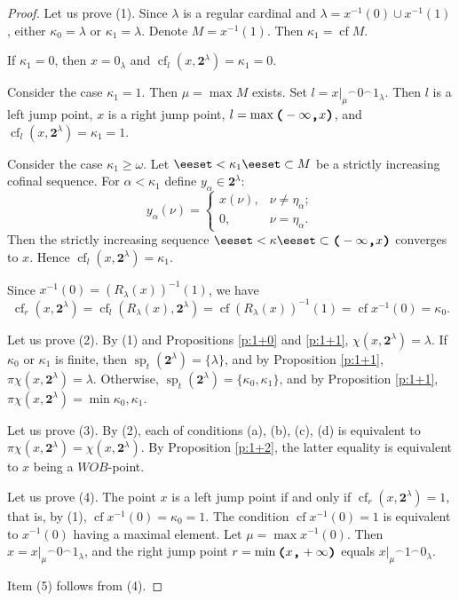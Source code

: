 \documentclass[preprint]{elsarticle}
\def\om{\omega}
\def\al{\alpha}
\def\la{\lambda}
\def\ka{\kappa}
\def\sp{\operatorname{sp}}
\def\sset#1{\{#1\}}
\def\set#1{\bbset#1\eeset}
\def\bbset#1:#2\eeset{\{#1\,:\,#2\}}
\newcommand\restrB[2]{\ensuremath{\left.#1\right|_{#2}}}
\def\restr#1#2{\restrB{#1}{#2}}
\theoremstyle{definition}
\theoremstyle{remark}
\def\cf{\operatorname{cf}}
\def\lex#1#2{\mathfrak{L}(#2^{#1})}
\def\lex#1#2{#2^{#1}}
\def\symblecnc{\mathbin{{}^\frown}}
\def\wob/{$WOB$}
\def\lL(#1,#2){(-\infty,#1)}
\def\lR(#1,#2){(#1,+\infty)}
\def\B{2}
\def\B{\mathsf{2}}
\def\B{\mathbf{2}}
\def\ilcomma/{\boldsymbol{,}}
\def\ilsymlp{\boldsymbol{(}}
\def\ilsymrp{\boldsymbol{)}}
\def\ilfont#1{\boldsymbol{#1}}
\def\ilfontX#1{\mathrm{\text{\texttt{\textbf{\large #1}}}}}
\def\ilfontX#1{{\text{\texttt{\textbf{\large \upshape #1}}}}}
\def\ilfont#1{\raisebox{-1.2pt}{\ilfontX{#1}}}
\def\ilfontC#1{\raisebox{-0.7pt}{\ilfontX{#1}}}
\def\ilcomma/{\ilfontC{,}}
\def\ilsymlp{\ilfont{(}}
\def\ilsymrp{\ilfont{)}}
\def\ilpp(#1,#2){\ilsymlp#1\ilcomma/ #2\ilsymrp}
\def\lL(#1,#2){\ilpp(-\infty, #1)}
\def\lR(#1,#2){\ilpp(#1, +\infty)}
\def\lexab{\lex\la\B}
\begin{document}
\begin{proof}
Let us prove (1). Since $\la$ is a regular cardinal and $\la=x^{-1}(0)\cup x^{-1}(1)$, either $\ka_0=\la$ or $\ka_1=\la$.
Denote $M=x^{-1}(1)$. Then $\ka_1=\cf M$.

If $\ka_1=0$, then $x=0_\la$ and $\cf_l(x,\lexab)=\ka_1=0$.

Consider the case $\ka_1=1$. Then $\mu=\max M$ exists.
Set $l=\restr x\mu \symblecnc 0 \symblecnc 1_\la$.
Then $l$ is a left jump point, $x$ is a right jump point, $l=\max \ilpp(-\infty,x)$, and $\cf_l(x,\lexab)=\ka_1=1$.

Consider the case $\ka_1\geq\om$.
Let $\set{\eta_\al:\al<\ka_1}\subset M$ be a strictly increasing cofinal sequence.
For $\al<\ka_1$ define $y_\al\in \lexab$:
\begin{equation*}
y_\al(\nu) = 
\begin{cases}
x(\nu),	& \nu\neq \eta_\al; 
\\
0,	& \nu= \eta_\al.
\end{cases}
\end{equation*}
Then the strictly increasing sequence $\set{y_\al:\al<\ka}\subset \lL(x,\lexab)$ converges to $x$.
Hence $\cf_l(x,\lexab)=\ka_1$.

Since $x^{-1}(0)=\left(R_\la(x)\right)^{-1}(1)$, we have
\[
\cf_r(x,\lexab)=\cf_l(R_\la(x),\lexab)=\cf \left(R_\la(x)\right)^{-1}(1)= \cf x^{-1}(0)=\ka_0.
\]

Let us prove (2). By (1) and Propositions \ref{p:1+0} and \ref{p:1+1}, $\chi(x,\lexab)=\la$. If $\ka_0$ or $\ka_1$ is finite, then $\sp_t(\lexab)=\sset \la$, and by Proposition \ref{p:1+1}, $\pi\chi(x,\lexab)=\la$. Otherwise, $\sp_t(\lexab)=\sset{\ka_0,\ka_1}$, and by Proposition \ref{p:1+1}, $\pi\chi(x,\lexab)=\min \ka_0,\ka_1$.

Let us prove (3). By (2), each of conditions (a), (b), (c), (d) is equivalent to $\pi\chi(x,\lexab)=\chi(x,\lexab)$. By Proposition \ref{p:1+2}, the latter equality is equivalent to $x$ being a \wob/-point.

Let us prove (4). The point $x$ is a left jump point if and only if $\cf_r(x,\lexab)=1$, that is, by (1), $\cf x^{-1}(0)=\ka_0=1$. The condition $\cf x^{-1}(0)=1$ is equivalent to $x^{-1}(0)$ having a maximal element. Let $\mu = \max x^{-1}(0)$. Then $x=\restr x\mu \symblecnc 0 \symblecnc 1_\la$, and the right jump point $r=\min \lR(x,X)$ equals $\restr x\mu \symblecnc 1 \symblecnc 0_\la$.

Item (5) follows from (4).
\end{proof}
\end{document}
